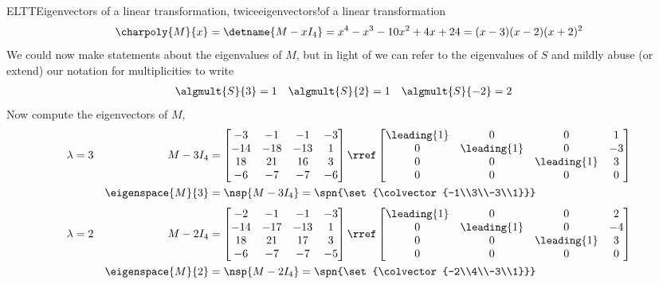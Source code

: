\begin{example}{ELTT}{Eigenvectors of a linear transformation, twice}{eigenvectors!of a linear transformation}
%
\begin{equation*}
\charpoly{M}{x}=\detname{M-xI_4}=x^4-x^3-10 x^2+4 x+24=(x-3) (x-2) (x+2)^2
\end{equation*}
%
We could now make statements about the eigenvalues of $M$, but in light of  we can refer to the eigenvalues of $S$ and mildly abuse (or extend) our notation for multiplicities to write
%
\begin{align*}
\algmult{S}{3}&=1
&
\algmult{S}{2}&=1
&
\algmult{S}{-2}&=2
\end{align*}
%
Now compute the eigenvectors of $M$,
%
\begin{align*}
\lambda&=3&M-3I_4&=
\begin{bmatrix}
 -3 & -1 & -1 & -3 \\
 -14 & -18 & -13 & 1 \\
 18 & 21 & 16 & 3 \\
 -6 & -7 & -7 & -6
\end{bmatrix}
\rref
\begin{bmatrix}
 \leading{1} & 0 & 0 & 1 \\
 0 & \leading{1} & 0 & -3 \\
 0 & 0 & \leading{1} & 3 \\
 0 & 0 & 0 & 0
\end{bmatrix}\\
&&\eigenspace{M}{3}&=\nsp{M-3I_4}
=\spn{\set{\colvector{-1\\3\\-3\\1}}}
\end{align*}
%
\begin{align*}
\lambda&=2&M-2I_4&=
\begin{bmatrix}
 -2 & -1 & -1 & -3 \\
 -14 & -17 & -13 & 1 \\
 18 & 21 & 17 & 3 \\
 -6 & -7 & -7 & -5
\end{bmatrix}
\rref
\begin{bmatrix}
 \leading{1} & 0 & 0 & 2 \\
 0 & \leading{1} & 0 & -4 \\
 0 & 0 & \leading{1} & 3 \\
 0 & 0 & 0 & 0
\end{bmatrix}\\
&&\eigenspace{M}{2}&=\nsp{M-2I_4}
=\spn{\set{\colvector{-2\\4\\-3\\1}}}
\end{align*}

\end{example}
